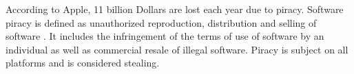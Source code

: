 According to Apple, 11 billion Dollars are lost each year due to piracy.
Software piracy is defined as unauthorized reproduction, distribution and selling of software \cite{applePiracy}.
It includes the infringement of the terms of use of software by an individual as well as commercial resale of illegal software.
Piracy is subject on all platforms and is considered stealing.

